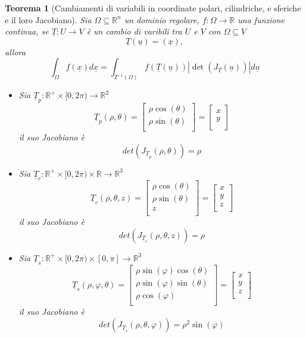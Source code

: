 \documentclass[12pt, a4paper]{article}
\theoremstyle{break}
\newtheorem{theorem}{Teorema} %
\begin{document}
\newpage
\begin{theorem} [Cambiamenti di variabili in coordinate polari, cilindriche, e
	sferiche e il loro Jacobiano]
	Sia $\Omega \subseteq \mathbb{R}^n$ un dominio regolare, $f: \Omega
		\to \mathbb{R}$ una funzione continua, se $\underline{T} : U \to
		V$ è un cambio di varibili tra $U$ e $V$ con $\Omega \subseteq V$
	\[
		\underline{T}(\underline{u}) = (\underline{x}),
	\]
	allora
	\[
		\int_{\Omega} f(\underline{x}) d \underline{x}
		= \int_{\underline{T}^{-1}(\Omega)} f(\underline{T}(\underline{u}))
		| \det(J_{\underline{T}}(\underline{u})) | d \underline{u}
	\]
	\begin{itemize}
		\item Sia $\underline{T}_p : \mathbb{R}^+ \times [0,2\pi) \to
				\mathbb{R}^2$
			\[
				\underline{T}_p(\rho, \theta) =
				\begin{bmatrix}
					\rho \cos(\theta) \\
					\rho \sin(\theta) \\
				\end{bmatrix}
				=
				\begin{bmatrix}
					x \\
					y \\
				\end{bmatrix}
			\]
			il suo Jacobiano è
			\[
				det(J_{\underline{T}_p} (\rho, \theta)) = \rho
			\]
		\item Sia $\underline{T}_c : \mathbb{R}^+ \times
				[0,2\pi) \times \mathbb{R} \to \mathbb{R}^3$
			\[
				\underline{T}_c (\rho, \theta, z) =
				\begin{bmatrix}
					\rho \cos(\theta) \\
					\rho \sin(\theta) \\
					z                 \\
				\end{bmatrix}
				=
				\begin{bmatrix}
					x \\
					y \\
					z \\
				\end{bmatrix}
			\]
			il suo Jacobiano è
			\[
				det(J_{\underline{T}_c} (\rho, \theta, z)) = \rho
			\]
		\item Sia $\underline{T}_s : \mathbb{R}^+ \times
				[0,2\pi) \times [0,\pi] \to \mathbb{R}^3$
			\[
				\underline{T}_s(\rho, \varphi, \theta) =
				\begin{bmatrix}
					\rho \sin(\varphi) \cos(\theta) \\
					\rho \sin(\varphi) \sin(\theta) \\
					\rho \cos(\varphi)              \\
				\end{bmatrix}
				=
				\begin{bmatrix}
					x \\
					y \\
					z \\
				\end{bmatrix}
			\]
			il suo Jacobiano è
			\[
				det(J_{\underline{T}_s} (\rho, \theta, \varphi)) = \rho^2
				\sin(\varphi)
			\]
	\end{itemize}
\end{theorem}
\end{document}
